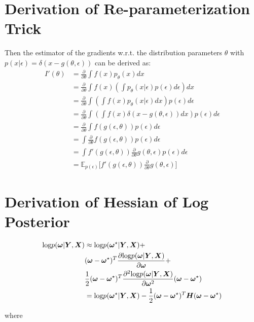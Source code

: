 \section{Derivation of Re-parameterization Trick}\label{d_repa}
Then the estimator of the gradients w.r.t. the distribution parameters $\theta$ with $p(x|\epsilon) = \delta(x-g(\theta,\epsilon))$ can be derived as:
\begin{equation}
\begin{aligned}
I'(\theta) &= \frac{\partial}{\partial \theta} \int f(x) p_{\theta}(x) dx \\
&= \frac{\partial}{\partial \theta} \int f(x)(\int p_{\theta}(x|\epsilon)p(\epsilon)d\epsilon) dx \\
&= \frac{\partial}{\partial \theta} \int (\int f(x) p_{\theta}(x|\epsilon)dx) p(\epsilon) d\epsilon \\
&= \frac{\partial}{\partial \theta} \int (\int f(x)\delta(x-g(\theta,\epsilon))dx) p(\epsilon) d\epsilon \\ 
&= \frac{\partial}{\partial \theta} \int f(g(\epsilon, \theta)) p(\epsilon) d\epsilon \\
&= \int \frac{\partial}{\partial \theta} f(g(\epsilon, \theta)) p(\epsilon) d\epsilon \\
&= \int f'(g(\epsilon, \theta))\frac{\partial}{\partial \theta}g(\theta, \epsilon) p(\epsilon) d\epsilon \\
&= \mathbb E_{p(\epsilon)}\big[ f'(g(\epsilon, \theta))\frac{\partial}{\partial \theta}g(\theta, \epsilon)\big] 
\end{aligned}
\end{equation} 

\section{Derivation of Hessian of Log Posterior}\label{d_second_Hessian}
 \begin{equation}
\begin{aligned} 
\text{log} p(\boldsymbol \omega| \boldsymbol Y, \boldsymbol X) &\approx 
\text{log}p(\boldsymbol \omega^\star|\boldsymbol Y, \boldsymbol X) + \\
&(\boldsymbol \omega - \boldsymbol \omega^\star)^T\frac{\partial \text{log} p(\boldsymbol \omega| \boldsymbol Y, \boldsymbol X)}{\partial \boldsymbol \omega} + \\
&\frac{1}{2}(\boldsymbol \omega - \boldsymbol \omega^\star)^T\frac{\partial^2\text{log} p(\boldsymbol \omega |\boldsymbol Y, \boldsymbol X)}{\partial \boldsymbol \omega^2}(\boldsymbol \omega - \boldsymbol \omega^\star)\\
&= \text{log}p(\boldsymbol \omega^\star|\boldsymbol Y, \boldsymbol X) - \frac{1}{2}(\boldsymbol \omega - \boldsymbol \omega^\star)^T\boldsymbol H(\boldsymbol \omega - \boldsymbol \omega^\star)
\end{aligned}
\end{equation}


where 


